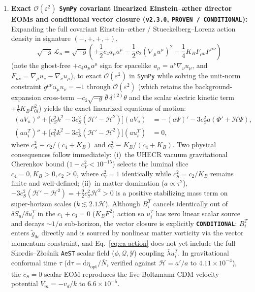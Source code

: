 \documentclass[11pt,a4paper]{article}
\begin{document}
\begin{enumerate}
    \item \textbf{Exact $\mathcal{O}(\varepsilon^2)$ \texttt{SymPy} covariant linearized Einstein--\ae{}ther director EOMs and conditional vector closure (\texttt{v2.3.0}, \texttt{PROVEN / CONDITIONAL}):}
    Expanding the full covariant Einstein--\ae{}ther / Stueckelberg--Lorenz action density in signature $(-,+,+,+)$,
    \begin{equation}
        \sqrt{-g}\,\mathcal{L}_u = \sqrt{-g}\!\left(+\frac{1}{2} c_4 a_\mu a^\mu - \frac{1}{2} c_2 (\nabla_\mu u^\mu)^2 - \frac{1}{4} K_B F_{\mu\nu} F^{\mu\nu}\right)
        \label{eq:ea-action}
    \end{equation}
    (note the ghost-free $+c_4 a_\mu a^\mu$ sign for spacelike $a_\mu = u^\nu\nabla_\nu u_\mu$, and $F_{\mu\nu} = \nabla_\mu u_\nu - \nabla_\nu u_\mu$), to exact $\mathcal{O}(\varepsilon^2)$ in \texttt{SymPy} while solving the unit-norm constraint $g^{\mu\nu}u_\mu u_\nu = -1$ through $\mathcal{O}(\varepsilon^2)$ (which retains the background-expansion cross-term $-c_2\sqrt{-g}\,\bar\theta\,\delta^{(2)}\theta$ and the scalar electric kinetic term $+\frac{1}{2} K_B F_{0i}^2$) yields the exact linearized equations of motion:
    \begin{equation}
    \begin{aligned}
        (a V_u)'' + \bigl[c_S^2 k^2 - 3 c_S^2 (\mathcal{H}' - \mathcal{H}^2)\bigr](a V_u) &= -(a\Psi)' - 3 c_S^2 a(\Phi' + \mathcal{H}\Psi), \\
        (a u_i^T)'' + \bigl[c_V^2 k^2 - 3 c_S^2 (\mathcal{H}' - \mathcal{H}^2)\bigr](a u_i^T) &= 0,
    \end{aligned}
        \label{eq:aest-director-eoms}
    \end{equation}
    where $c_S^2 \equiv c_2/(c_4 + K_B)$ and $c_V^2 \equiv K_B/(c_4 + K_B)$. Two physical consequences follow immediately: (i)~the UHECR vacuum gravitational Cherenkov bound ($1 - c_V^2 < 10^{-15}$) selects the luminal slice $c_4 = 0, K_B > 0, c_2 \ge 0$, where $c_V^2 = 1$ identically while $c_S^2 = c_2/K_B$ remains finite and well-defined; (ii)~in matter domination ($a \propto \tau^2$), $-3 c_S^2 (\mathcal{H}' - \mathcal{H}^2) = +\frac{9}{2} c_S^2 \mathcal{H}^2 > 0$ is a positive stabilizing mass term on super-horizon scales ($k \lesssim 2.1\mathcal{H}$). Although $B_i^T$ cancels identically out of $\delta S_u/\delta u_i^T$ in the $c_1+c_3 = 0$ ($K_B F^2$) action so $u_i^T$ has zero linear scalar source and decays $\sim 1/a$ sub-horizon, the vector closure is explicitly \textbf{\texttt{CONDITIONAL}}: $B_i^T$ enters $\tilde{g}_{0i}$ directly and is sourced by nonlinear matter vorticity via the vector momentum constraint, and Eq.~\eqref{eq:ea-action} does not yet include the full Skordis--Z{\l}o\'snik \texttt{AeST} scalar field ($\phi, \mathcal{Q}, \mathcal{Y}$) coupling $\bar\lambda u_i^T$. In gravitational conformal time $\tau$ ($\mathrm{d}\tau = \mathrm{d}\eta_{\mathrm{opt}}/\bar{N}$, verified against $\mathcal{H} = a'/a$ to $4.11\times 10^{-4}$), the $c_S = 0$ scalar EOM reproduces the live Boltzmann CDM velocity potential $V_m = -v_d/k$ to $6.6\times 10^{-5}$.

\end{enumerate}
\end{document}
